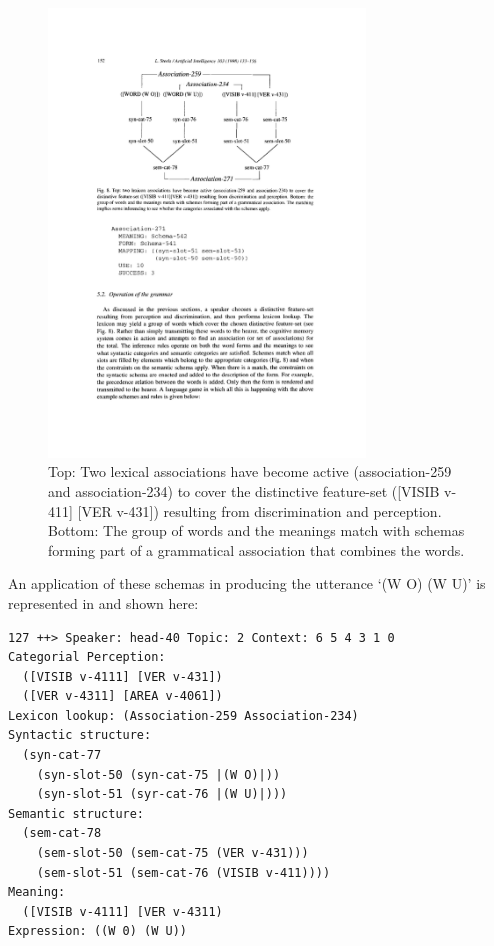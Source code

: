 \begin{figure}[t]
\centerline{
\includegraphics[width=0.75\textwidth]{chap10/figs/associations.pdf}}
\caption{\label{fig:associations} 
Top: Two lexical associations have become active (association-259 and association-234) to cover the distinctive 
feature-set ([VISIB v-411] [VER v-431]) resulting from discrimination and perception. Bottom: 
The group of words and the meanings match with schemas forming part of a grammatical association that combines the words. }
\end{figure}
An application of these schemas in producing the utterance `(W O) (W U)' is represented in  and shown 
here: 
\begin{verbatim}
127 ++> Speaker: head-40 Topic: 2 Context: 6 5 4 3 1 0
Categorial Perception:
  ([VISIB v-4111] [VER v-431])
  ([VER v-4311] [AREA v-4061])
Lexicon lookup: (Association-259 Association-234)
Syntactic structure:
  (syn-cat-77
    (syn-slot-50 (syn-cat-75 |(W O)|))
    (syn-slot-51 (syr-cat-76 |(W U)|)))
Semantic structure:
  (sem-cat-78
    (sem-slot-50 (sem-cat-75 (VER v-431)))
    (sem-slot-51 (sem-cat-76 (VISIB v-411))))
Meaning:
  ([VISIB v-4111] [VER v-4311)
Expression: ((W 0) (W U))
\end{verbatim}

